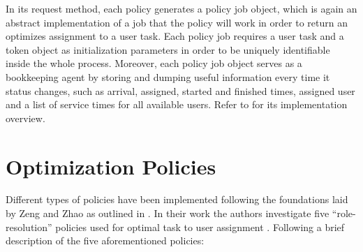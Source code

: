\documentclass{seal_thesis}
\begin{document}

In its request method, each policy generates a policy job object, which is again an abstract implementation of a job that the policy will work in order to return an optimizes assignment to a user task. Each policy job requires a user task and a token object as initialization parameters in order to be uniquely identifiable inside the whole process. Moreover, each policy job object serves as a bookkeeping agent by storing and dumping useful information every time it status changes, such as arrival, assigned, started and finished times, assigned user and a list of service times for all available users. Refer to  for its implementation overview.


\section{Optimization Policies}
\label{sec:opt_policies}

Different types of policies have been implemented following the foundations laid by Zeng and Zhao as outlined in . In their work the authors investigate five ``role-resolution'' policies used for optimal task to user assignment \cite[p. 7]{Zeng2005}. Following a brief description of the five aforementioned policies:
\end{document}
